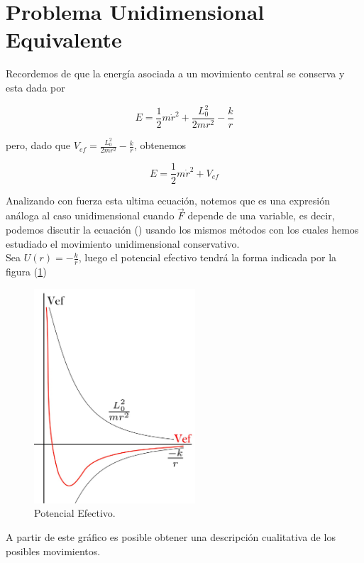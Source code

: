 \documentclass[12pt]{report}
\begin{document}
\section{Problema Unidimensional Equivalente}


Recordemos de que la energía asociada a un movimiento central se conserva y esta dada por 

\begin{equation}
E= \frac{1}{2}m\dot{r}^2 + \frac{L_0^2}{2mr^2} -\frac{k}{r}
\end{equation}

pero, dado que  $V_{ef} = \displaystyle \frac{L_0^2}{2mr^2} -\frac{k}{r} $, obtenemos

\begin{equation}
E=\frac{1}{2}m\dot{r}^2 + V_{ef}
\end{equation}

Analizando con fuerza esta ultima ecuación, notemos que es una expresión análoga al caso unidimensional  cuando $\vec{F}$ depende de una variable, es decir, podemos discutir la ecuación () usando los mismos métodos con los cuales hemos estudiado el movimiento unidimensional conservativo. \\

Sea $U(r)= - \displaystyle \frac{k}{r}$, luego el potencial efectivo tendrá la forma indicada por la figura (\ref{fig35})


\begin{figure}[H]
	\begin{center}
	\includegraphics[width=6cm]{figura151.png} 
	\caption{ Potencial Efectivo.}
	\label{fig35}
	\end{center}
\end{figure}


 A partir de este gráfico es posible obtener una descripción cualitativa de los posibles movimientos.
\end{document}
